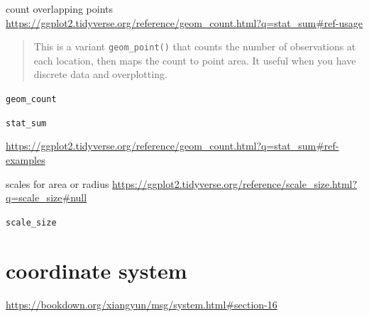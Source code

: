 \documentclass[
]{book}
\theoremstyle{definition}
\theoremstyle{definition}
\theoremstyle{definition}
\theoremstyle{definition}
\theoremstyle{remark}
\begin{document}
count overlapping points \url{https://ggplot2.tidyverse.org/reference/geom_count.html?q=stat_sum\#ref-usage}

\begin{quote}
This is a variant \texttt{geom\_point()} that counts the number of observations at each location, then maps the count to point area. It useful when you have discrete data and overplotting.
\end{quote}

\texttt{geom\_count}

\texttt{stat\_sum}

\url{https://ggplot2.tidyverse.org/reference/geom_count.html?q=stat_sum\#ref-examples}

scales for area or radius \url{https://ggplot2.tidyverse.org/reference/scale_size.html?q=scale_size\#null}

\texttt{scale\_size}

\section{coordinate system}\label{coordinate-system}

\url{https://bookdown.org/xiangyun/msg/system.html\#section-16}
\end{document}
